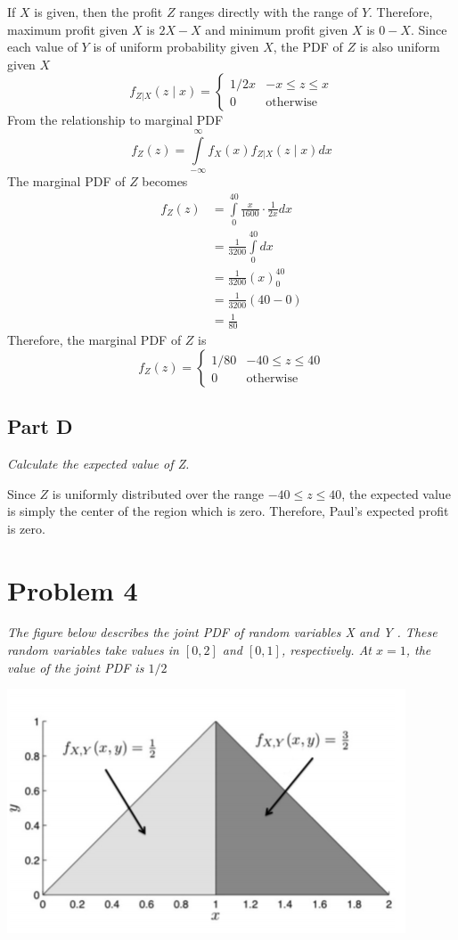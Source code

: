 \documentclass{article}
\begin{document}
If $X$ is given, then the profit $Z$ ranges directly with the range of $Y$.
Therefore, maximum profit given $X$ is $2X - X$ and minimum profit given $X$
is $0 - X$. Since each value of $Y$ is of uniform probability given $X$, the
PDF of $Z$ is also uniform given $X$
$$ f_{Z|X}(z \mid x) = \begin{cases}
    1 / 2x & -x \leq z \leq x \\
    0 & \mathrm{otherwise}
\end{cases} $$
From the relationship to marginal PDF
$$ f_Z(z) = \int\limits_{-\infty}^\infty f_X(x) f_{Z|X}(z \mid x) dx $$
The marginal PDF of $Z$ becomes
\begin{align*} f_Z(z) &= \int\limits_0^{40} \frac{x}{1600} \cdot \frac{1}{2x} dx \\
    &= \frac{1}{3200} \int\limits_0^{40} dx \\
    &= \frac{1}{3200} \left(x \right)_0^40 \\
    &= \frac{1}{3200} \left(40 - 0 \right) \\
    &= \frac{1}{80}
\end{align*}
Therefore, the marginal PDF of $Z$ is
$$ f_Z(z) = \begin{cases}
    1/80 & -40 \leq z \leq 40 \\
    0 & \mathrm{otherwise}
\end{cases} $$

\subsection*{Part D}

\textit{Calculate the expected value of Z.}

\bigbreak

Since $Z$ is uniformly distributed over the range $ -40 \leq z \leq 40 $, the
expected value is simply the center of the region which is zero. Therefore,
Paul's expected profit is zero.

\section*{Problem 4}

\textit{The figure below describes the joint PDF of random variables X and Y
. These random variables take values in $[0, 2]$ and $[0, 1]$, respectively.
At $x = 1$, the value of the joint PDF is $1/2$}

\begin{center}
    \includegraphics[scale=1]{Images/P4.PNG}
\end{center}
\end{document}
